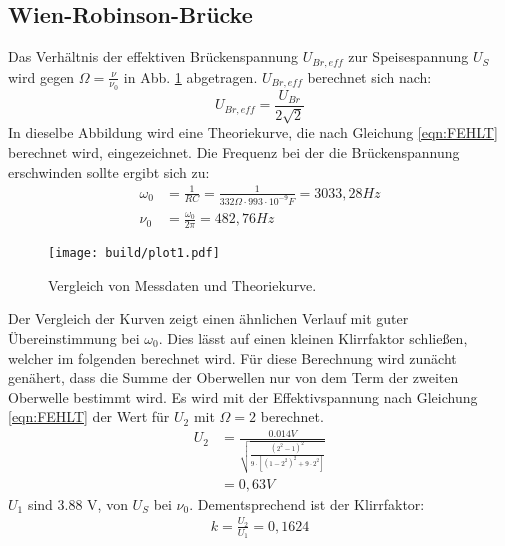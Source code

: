 \subsection{Wien-Robinson-Brücke}
\label{sec:Wien}
Das Verhältnis der effektiven Brückenspannung $U_{Br,eff}$ zur Speisespannung $U_S$ wird gegen $\Omega = \frac{\nu}{\nu_0}$ in Abb. \ref{fig:plot} abgetragen.
$U_{Br,eff}$ berechnet sich nach:
\begin{equation}
  U_{Br,eff} = \frac{U_{Br}}{2 \sqrt{2}}
\end{equation}
In dieselbe Abbildung wird eine Theoriekurve, die nach Gleichung \ref{eqn:FEHLT} berechnet wird, eingezeichnet.
Die Frequenz bei der die Brückenspannung erschwinden sollte ergibt sich zu:
\begin{align}
  \omega_0 &= \frac{1}{RC} = \frac{1}{332 \Omega \cdot 993 \cdot 10^{-9} F} = 3033,28 Hz \\
  \nu_0 &= \frac{\omega_0}{2 \pi} = 482,76 Hz
\end{align} 
\newpage
\begin{figure}
  \centering
  \texttt{[image: build/plot1.pdf]}
  \caption{Vergleich von Messdaten und Theoriekurve.}
  \label{fig:plot}
\end{figure}
Der Vergleich der Kurven zeigt einen ähnlichen Verlauf mit guter Übereinstimmung bei $\omega_0$.
Dies lässt auf einen kleinen Klirrfaktor schließen, welcher im folgenden berechnet wird.
Für diese Berechnung wird zunächt genähert, dass die Summe der Oberwellen nur von dem Term der zweiten Oberwelle bestimmt wird.
Es wird mit der Effektivspannung nach Gleichung \ref{eqn:FEHLT} der Wert für $U_2$ mit $\Omega = 2$ berechnet.
\begin{align}
  U_2 &= \frac{0.014 V}{\sqrt{\frac{(2^2-1)^2}{9 \cdot [(1-2^2)^2+9 \cdot 2^2]}}} \\
  &= 0,63 V
\end{align}
$U_1$ sind 3.88 V, von $U_S$ bei $\nu_0$.
Dementsprechend ist der Klirrfaktor:
\begin{align}
  k = \frac{U_2}{U_1} = 0,1624
\end{align}
